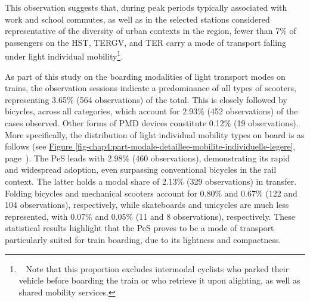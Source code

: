 \begin{refsegment}
This observation suggests that, during peak periods typically associated with work and school commutes, as well as in the selected stations considered representative of the diversity of urban contexts in the region, fewer than 7\% of passengers on the \acrfull{HST}, \acrfull{TERGV}, and \acrfull{TER} carry a mode of transport falling under light individual mobility\footnote{~
    Note that this proportion excludes intermodal cyclists who parked their vehicle before boarding the train or who retrieve it upon alighting, as well as shared mobility services.
}.%

As part of this study on the boarding modalities of light transport modes on trains, the observation sessions indicate a predominance of all types of scooters, representing 3.65\% (564 observations) of the total. This is closely followed by bicycles, across all categories, which account for 2.93\% (452 observations) of the cases observed. Other forms of \acrfull{PMD} devices constitute 0.12\% (19 observations). More specifically, the distribution of light individual mobility types on board is as follows (see \hyperref[fig-chap4:part-modale-detaillee-mobilite-individuelle-legere]{Figure \ref{fig-chap4:part-modale-detaillee-mobilite-individuelle-legere}}, page~\pageref{fig-chap4:part-modale-detaillee-mobilite-individuelle-legere}). The \acrshort{PeS} leads with 2.98\% (460 observations), demonstrating its rapid and widespread adoption, even surpassing conventional bicycles in the rail context. The latter holds a modal share of 2.13\% (329 observations) in transfer. Folding bicycles and mechanical scooters account for 0.80\% and 0.67\% (122 and 104 observations), respectively, while skateboards and unicycles are much less represented, with 0.07\% and 0.05\% (11 and 8 observations), respectively. These statistical results highlight that the \acrshort{PeS} proves to be a mode of transport particularly suited for train boarding, due to its lightness and compactness.%


\end{refsegment}
